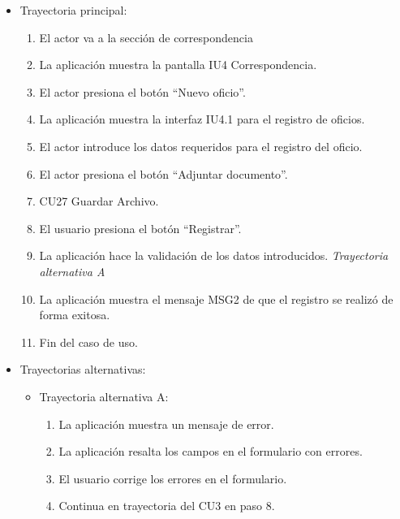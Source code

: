 \begin{itemize}
	\item Trayectoria principal:
	\begin{enumerate}
		\item El actor va a la sección de correspondencia 
		\item La aplicación muestra la pantalla IU4 Correspondencia.
		\item El actor presiona el botón “Nuevo oficio”.
		\item La aplicación muestra la interfaz IU4.1 para el registro de oficios.
		\item El actor introduce los datos requeridos para el registro del oficio.
		\item El actor presiona el botón “Adjuntar documento”.
		\item CU27 Guardar Archivo.
		\item El usuario presiona el botón “Registrar”. 
		\item La aplicación hace la validación de los datos introducidos. \textsl{Trayectoria alternativa A} 
		\item La aplicación muestra el mensaje MSG2 de que el registro se realizó de forma exitosa.
		\item Fin del caso de uso.
	\end{enumerate}
	
	\item Trayectorias alternativas:
	\begin{itemize}
		\item Trayectoria alternativa A:
			\begin{enumerate}
				\item La aplicación muestra un mensaje de error.
				\item La aplicación resalta los campos en el formulario con errores.
				\item El usuario corrige los errores en el formulario.
				\item Continua en trayectoria del CU3 en paso 8.
			\end{enumerate}
	\end{itemize}
\end{itemize}
